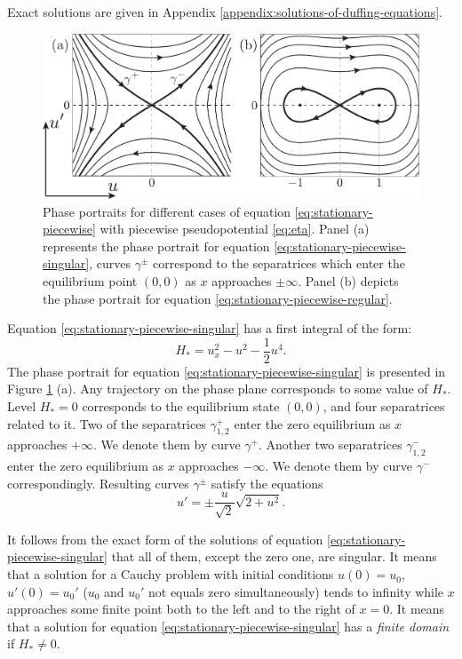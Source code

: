 Exact solutions are given in Appendix \ref{appendix:solutions-of-duffing-equations}.
\begin{figure}[h]
\centering
	\includegraphics[scale = 1]{pic/phase portraits}
	\caption{Phase portraits for different cases of equation \eqref{eq:stationary-piecewise} with piecewise pseudopotential \eqref{eq:eta}. Panel (a) represents the phase portrait for equation \eqref{eq:stationary-piecewise-singular}, curves $\gamma^{\pm}$ correspond to the separatrices which enter the equilibrium point $(0, 0)$ as $x$ approaches $\pm \infty$. Panel (b) depicts the phase portrait for equation \eqref{eq:stationary-piecewise-regular}.}
\label{fig:phase-portraits}
\end{figure}

Equation \eqref{eq:stationary-piecewise-singular} has a first integral of the form:
\begin{equation}
	H_* = u_x^2 - u^2 - \frac{1}{2} u^4.
\label{eq:stationary-piecewise-singular-integral}
\end{equation}
The phase portrait for equation \eqref{eq:stationary-piecewise-singular} is presented in Figure \ref{fig:phase-portraits} (a).
Any trajectory on the phase plane corresponds to some value of $H_*$.
Level $H_* = 0$ corresponds to the equilibrium state $(0, 0)$, and four separatrices related to it.
Two of the separatrices $\gamma_{1,2}^+$ enter the zero equilibrium as $x$ approaches $+\infty$.
We denote them by curve $\gamma^+$.
Another two separatrices $\gamma_{1,2}^-$ enter the zero equilibrium as $x$ approaches $-\infty$.
We denote them by curve $\gamma^-$ correspondingly.
Resulting curves $\gamma^{\pm}$ satisfy the equations
\begin{equation}
	u' = \pm \frac{u}{\sqrt{2}} \sqrt{2 + u^2}.
\end{equation}

It follows from the exact form of the solutions of equation \eqref{eq:stationary-piecewise-singular} that all of them, except the zero one, are singular.
It means that a solution for a Cauchy problem with initial conditions $u(0) = u_0$, $u'(0) = u_0'$ ($u_0$ and $u_0'$ not equals zero simultaneously) tends to infinity while $x$ approaches some finite point both to the left and to the right of $x = 0$.
It means that a solution for equation \eqref{eq:stationary-piecewise-singular} has a {\it finite domain} if $H_* \neq 0$.

